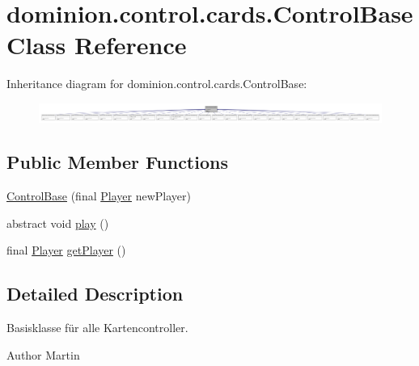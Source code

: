 \hypertarget{classdominion_1_1control_1_1cards_1_1ControlBase}{\section{dominion.\-control.\-cards.\-Control\-Base \-Class \-Reference}
\label{classdominion_1_1control_1_1cards_1_1ControlBase}
}


\-Inheritance diagram for dominion.\-control.\-cards.\-Control\-Base\-:
\nopagebreak
\begin{figure}[H]
\begin{center}
\leavevmode
\includegraphics[width=350pt]{classdominion_1_1control_1_1cards_1_1ControlBase__inherit__graph}
\end{center}
\end{figure}
\subsection*{\-Public \-Member \-Functions}
\begin{DoxyCompactItemize}
\item 
\hyperlink{classdominion_1_1control_1_1cards_1_1ControlBase_ab9d04f8df9bcc24a84e92a3a8fa98dd8}{\-Control\-Base} (final \hyperlink{interfacedominion_1_1model_1_1Player}{\-Player} new\-Player)
\item 
abstract void \hyperlink{classdominion_1_1control_1_1cards_1_1ControlBase_ae680934ce17aeba7e109c3bd925dce95}{play} ()
\item 
final \hyperlink{interfacedominion_1_1model_1_1Player}{\-Player} \hyperlink{classdominion_1_1control_1_1cards_1_1ControlBase_a68f4d6b9760371e228fb4f8b745b90d5}{get\-Player} ()
\end{DoxyCompactItemize}


\subsection{\-Detailed \-Description}
\-Basisklasse für alle \-Kartencontroller.

\begin{DoxyAuthor}{\-Author}
\-Martin 
\end{DoxyAuthor}


